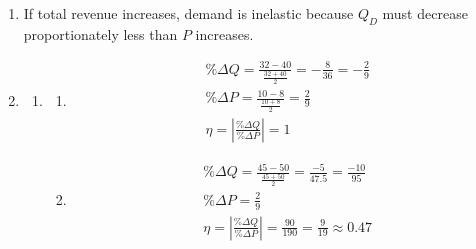 \documentclass{article}
\begin{document}
\begin{enumerate}
\begin{enumerate}
	\vspace{5mm}
	
	Long run:
	\begin{align*}
	\eta_{LR} &= \left| \frac{\% \Delta Q_{LR}}{\% \Delta P} \right| \\
	0.7 &= \frac{| \% \Delta Q_{LR} |}{0.2} \\
	0.14 &= | \% \Delta Q_{LR} | \\
	-0.14 &= \% \Delta Q_{LR} \text{ (by the law of demand)}
	\end{align*}
	In the long run, the quantity of heating oil demanded decreases by 0.14\%.
	
	\item A longer time horizon gives people more time to find substitutes for heating oil and change their behavior -- for example switching their home to natural gas -- so we would expect demand to be more elastic in the long run.
	
	\end{enumerate}
	
\item If total revenue increases, demand is inelastic because $Q_D$ must decrease proportionately less than $P$ increases.

\item

	\begin{enumerate}
	
	\item
	
		\begin{enumerate}
		
		\item 
		\begin{gather*}
		\% \Delta Q = \frac{32 - 40}{\frac{32 + 40}{2}} = -\frac{8}{36} = -\frac{2}{9} \\
		\% \Delta P = \frac{10 - 8}{\frac{10 + 8}{2}} = \frac{2}{9} \\
		\eta = \left| \frac{\% \Delta Q}{\% \Delta P} \right| = 1
		\end{gather*}
		
		\item
		\begin{gather*}
		\% \Delta Q = \frac{45 - 50}{\frac{45 + 50}{2}} = \frac{-5}{47.5} = \frac{-10}{95} \\
		\% \Delta P = \frac{2}{9} \\
		\eta = \left| \frac{\% \Delta Q}{\% \Delta P} \right| = \frac{90}{190} = \frac{9}{19} \approx 0.47
		\end{gather*}
		

\end{enumerate}
\end{enumerate}
\end{enumerate}
\end{document}
